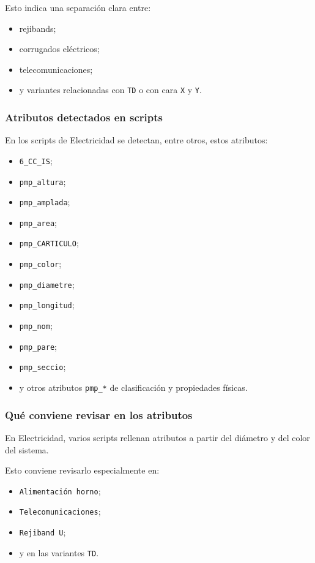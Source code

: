 Esto indica una separación clara entre:

\begin{itemize}
\item rejibands;
\item corrugados eléctricos;
\item telecomunicaciones;
\item y variantes relacionadas con \texttt{TD} o con cara \texttt{X} y \texttt{Y}.
\end{itemize}


\subsubsection{Atributos detectados en scripts}

En los scripts de Electricidad se detectan, entre otros, estos atributos:

\begin{itemize}
\item \texttt{6\_CC\_IS};
\item \texttt{pmp\_altura};
\item \texttt{pmp\_amplada};
\item \texttt{pmp\_area};
\item \texttt{pmp\_CARTICULO};
\item \texttt{pmp\_color};
\item \texttt{pmp\_diametre};
\item \texttt{pmp\_longitud};
\item \texttt{pmp\_nom};
\item \texttt{pmp\_pare};
\item \texttt{pmp\_seccio};
\item y otros atributos \texttt{pmp\_*} de clasificación y propiedades físicas.
\end{itemize}

\subsubsection{Qué conviene revisar en los atributos}

En Electricidad, varios scripts rellenan atributos a partir del diámetro y del color del sistema.

Esto conviene revisarlo especialmente en:

\begin{itemize}
\item \texttt{Alimentación horno};
\item \texttt{Telecomunicaciones};
\item \texttt{Rejiband U};
\item y en las variantes \texttt{TD}.
\end{itemize}


